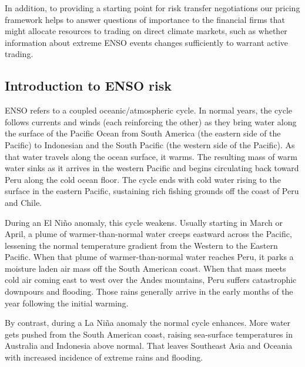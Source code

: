 \documentclass[authoryear]{article}
\begin{document}
In addition, to providing a starting point for risk transfer negotiations our pricing framework helps to answer questions of importance to the financial firms that might allocate resources to trading on direct climate markets, such as whether information about extreme ENSO events changes sufficiently to warrant active trading.

\subsection{Introduction to ENSO risk}
ENSO refers to a coupled oceanic/atmospheric cycle. In normal years, the cycle follows currents and winds (each reinforcing the other) as they bring water along the surface of the Pacific Ocean from South America (the eastern side of the Pacific) to Indonesian and the South Pacific (the western side of the Pacific). As that water travels along the ocean surface, it warms. The resulting mass of warm water sinks as it arrives in the western Pacific and begins circulating back toward Peru along the cold ocean floor. The cycle ends with cold water rising to the surface in the eastern Pacific, sustaining rich fishing grounds off the coast of Peru and Chile.

During an El Ni\~no anomaly, this cycle weakens. Usually starting in March or April, a plume of warmer-than-normal water creeps eastward across the Pacific, lessening the normal temperature gradient from the Western to the Eastern Pacific. When that plume of warmer-than-normal water reaches Peru, it parks a moisture laden air mass off the South American coast. When that mass meets cold air coming east to west over the Andes mountains, Peru suffers catastrophic downpours and flooding. Those rains generally arrive in the early months of the year following the initial warming.

By contrast, during a La Ni\~na anomaly the normal cycle enhances. More water gets pushed from the South American coast, raising sea-surface temperatures in Australia and Indonesia above normal. That leaves Southeast Asia and Oceania with increased incidence of extreme rains and flooding.
\end{document}
